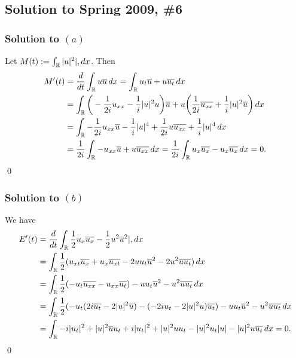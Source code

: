 \subsection*{Solution to Spring 2009, \#6}\label{s096}
\subsubsection*{Solution to $(a)$}
Let $M(t) := \int_{\mathbb{R}}|u|^{2}|, dx$. Then
\begin{align*}
M'(t) &= \frac{d}{dt}\int_{\mathbb{R}}u\overline{u}\, dx = \int_{\mathbb{R}}u_{t}\overline{u} + u\overline{u_{t}}\, dx\\
&= \int_{\mathbb{R}}\bigg(-\frac{1}{2i}u_{xx} - \frac{1}{i}|u|^{2}u\bigg)\overline{u} + u\bigg(\frac{1}{2i}\overline{u_{xx}} + \frac{1}{i}|u|^{2}\overline{u}\bigg)\, dx\\
&= \int_{\mathbb{R}}-\frac{1}{2i}u_{xx}\overline{u} - \frac{1}{i}|u|^{4} + \frac{1}{2i}u\overline{u_{xx}} + \frac{1}{i}|u|^{4}\, dx\\
&= \frac{1}{2i}\int_{\mathbb{R}}-u_{xx}\overline{u} + u\overline{u_{xx}}\, dx = \frac{1}{2i}\int_{\mathbb{R}}u_{x}\overline{u_{x}} - u_{x}\overline{u_{x}}\, dx = 0.
\end{align*}
\hfill\qed

\subsubsection*{Solution to $(b)$}
We have
\begin{align*}
E'(t) &= \frac{d}{dt}\int_{\mathbb{R}}\frac{1}{2}u_{x}\overline{u_{x}} - \frac{1}{2}u^{2}\overline{u}^{2}|, dx\\
&= \int_{\mathbb{R}}\frac{1}{2}(u_{xt}\overline{u_{x}} + u_{x}\overline{u_{xt}} - 2uu_{t}\overline{u}^{2} - 2u^{2}\overline{u}\overline{u_{t}})\, dx\\
&= \int_{\mathbb{R}}\frac{1}{2}(-u_{t}\overline{u_{xx}} - u_{xx}\overline{u_{t}}) - uu_{t}\overline{u}^{2} - u^{2}\overline{u}\overline{u_{t}}\, dx\\
&= \int_{\mathbb{R}}\frac{1}{2}(-u_{t}(2i\overline{u_{t}} - 2|u|^{2}\overline{u}) - (-2iu_{t} - 2|u|^{2}u)\overline{u_{t}}) - uu_{t}\overline{u}^{2} - u^{2}\overline{u}\overline{u_{t}}\, dx\\
&= \int_{\mathbb{R}}-i|u_{t}|^{2} + |u|^{2}\overline{u}u_{t} + i|u_{t}|^{2} + |u|^{2}uu_{t} - |u|^{2}u_{t}|u| - |u|^{2}u\overline{u_{t}}\, dx = 0.
\end{align*}
\hfill\qed

